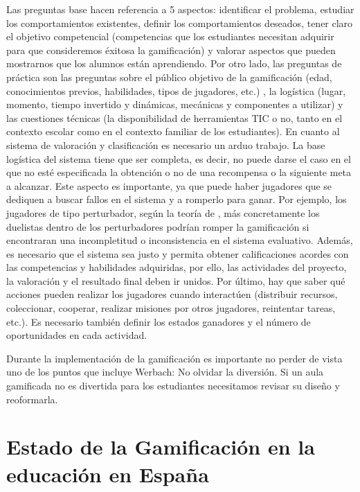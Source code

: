 Las preguntas base hacen referencia a 5 aspectos: identificar el problema, estudiar los comportamientos existentes, definir los comportamientos deseados, tener claro el objetivo competencial (competencias que los estudiantes necesitan adquirir para que consideremos éxitosa la gamificación) y valorar aspectos que pueden mostrarnos que los alumnos están aprendiendo.
%
Por otro lado, las preguntas de práctica son las preguntas sobre el público objetivo de la gamificación (edad, conocimientos previos, habilidades, tipos de jugadores, etc.) , la logística (lugar, momento, tiempo invertido y dinámicas, mecánicas y componentes a utilizar) y las cuestiones técnicas (la disponibilidad de herramientas TIC o no, tanto en el contexto escolar como en el contexto familiar de los estudiantes).
%
En cuanto al sistema de valoración y clasificación es necesario un arduo trabajo.
%
La base logística del sistema tiene que ser completa, es decir, no puede darse el caso en el que no esté especificada la obtención o no de una recompensa o la siguiente meta a alcanzar.
%
Este aspecto es importante, ya que puede haber jugadores que se dediquen a buscar fallos en el sistema y a romperlo para ganar.
%
Por ejemplo, los jugadores de tipo perturbador, según la teoría de  \citet{marczewski}, más concretamente los duelistas dentro de los perturbadores podrían romper la gamificación si encontraran una incompletitud o inconsistencia en el sistema evaluativo.
%
Además, es necesario que el sistema sea justo y permita obtener calificaciones acordes con las competencias y habilidades adquiridas, por ello, las actividades del proyecto, la valoración y el resultado final deben ir unidos.
%
Por último, hay que saber qué acciones pueden realizar los jugadores cuando interactúen (distribuir recursos, coleccionar, cooperar, realizar misiones por otros jugadores, reintentar tareas, etc.). 
%
Es necesario también definir los estados ganadores y el número de oportunidades en cada actividad.

Durante la implementación de la gamificación es importante no perder de vista uno de los puntos que incluye Werbach: No olvidar la diversión.
%
Si un aula gamificada no es divertida para los estudiantes necesitamos revisar su diseño y reoformarla.


\section{Estado de la Gamificación en la educación en España}

